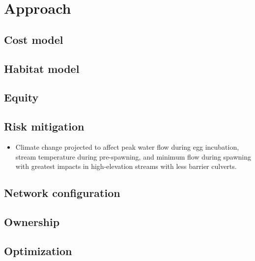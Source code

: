 \documentclass[12pt]{elsarticle}
\begin{document}
%
\section{Approach}
\subsection{Cost model}
\subsection{Habitat model}
\subsection{Equity}
\subsection{Risk mitigation}

\begin{itemize}
\item Climate change projected to affect peak water flow during egg incubation, stream temperature during pre-spawning, and minimum flow during spawning \citet{battin2007projected} with greatest impacts in high-elevation streams with less barrier culverts. 
\end{itemize}

\subsection{Network configuration}
\subsection{Ownership}

\subsection{Optimization}
\end{document}
